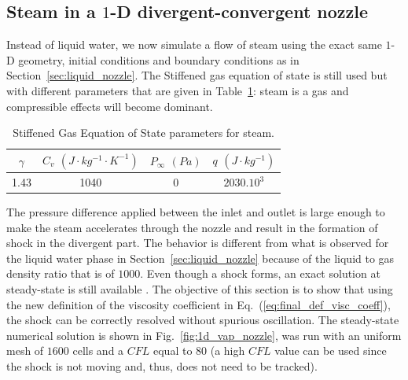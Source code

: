 \documentclass[preprint,10pt]{elsarticle}
\newcommand{\eqt}[1]{Eq.~(\ref{#1})}                     %
\newcommand{\fig}[1]{Fig.~\ref{#1}}                      %
\newcommand{\tbl}[1]{Table~\ref{#1}}                     %
\newcommand{\sct}[1]{Section~\ref{#1}}                   %
\begin{document}
\subsection{Steam in a $1$-D divergent-convergent nozzle} \label{sec:steam_nozzle}
Instead of liquid water, we now simulate a flow of steam using the exact same $1$-D geometry, initial conditions and boundary conditions as in \sct{sec:liquid_nozzle}. The Stiffened gas equation of state is still used but with different parameters that are given in \tbl{tbl:stff_gas_eos_vap}: steam is a gas and compressible effects will become dominant. 
\begin{table}[H]
\begin{center}
 \caption{\label{tbl:stff_gas_eos_vap} Stiffened Gas Equation of State parameters for steam.}
 \begin{tabular}{|c|c|c|c|}
 \hline
$\gamma$ & $C_v$ $(J\cdot kg^{-1} \cdot K^{-1})$ & $P_\infty$ $(Pa)$ & $q$ $(J \cdot kg^{-1})$ \\
 \hline
1.43 & 1040 & 0 & $2030.10^3$   \\
 \hline
\end{tabular}
\end{center}
\end{table}
The pressure difference applied between the inlet and outlet is large enough to make the steam accelerates through the nozzle and result in the formation of shock in the divergent part. The behavior is different from what is observed for the liquid water phase in \sct{sec:liquid_nozzle} because of the liquid to gas density ratio that is of $1000$. Even though a shock forms, an exact solution at steady-state is still available \cite{nozzle_exact}. The objective of this section is to show that using the new definition of the viscosity coefficient in \eqt{eq:final_def_visc_coeff}, the shock can be correctly resolved without spurious oscillation. The steady-state numerical solution is shown in \fig{fig:1d_vap_nozzle}, was run with an uniform mesh of $1600$ cells and a $CFL$ equal to $80$ (a high $CFL$ value can be used since the shock is not moving and, thus, does not need to be tracked).
\end{document}
